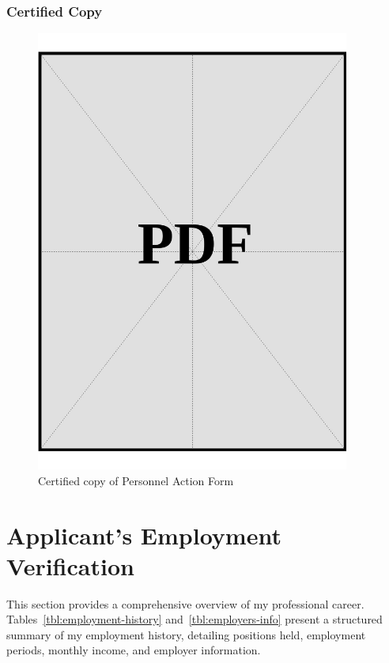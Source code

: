 \clearpage

\subsubsection*{Certified Copy}

\vspace*{\fill}
\begin{figure}[H]
    \centering
    \includegraphics[width=0.92\textwidth]{../application-docs/sponsor/employment/employment-letter-certified-copy.pdf}
    \caption{Certified copy of Personnel Action Form}
    \label{fig:paf-certified-copy}
\end{figure}
\vspace*{\fill}
\clearpage


\section{Applicant's Employment Verification}

This section provides a comprehensive overview of my professional career. Tables~\ref{tbl:employment-history} and~\ref{tbl:employers-info} present a structured summary of my employment history, detailing positions held, employment periods, monthly income, and employer information.

